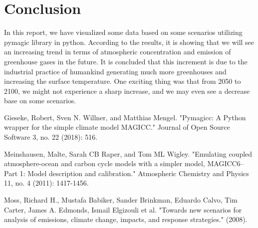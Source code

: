 \documentclass[12pt]{article}
\begin{document}
\section{Conclusion}
\label{lab:conclusion}
In this report, we have visualized some data based on some scenarios utilizing pymagic library in python. According to the results, it is showing that we will see an increasing trend in terms of atmospheric concentration and emission of greenhouse gases in the future. It is concluded that this increment is due to the industrial practice of humankind generating much more greenhouses and increasing the surface temperature. One exciting thing was that from 2050 to 2100, we might not experience a sharp increase, and we may even see a decrease base on some scenarios. 

\begin{thebibliography}{9}
Gieseke, Robert, Sven N. Willner, and Matthias Mengel. "Pymagicc: A Python wrapper for the simple climate model MAGICC." Journal of Open Source Software 3, no. 22 (2018): 516.

Meinshausen, Malte, Sarah CB Raper, and Tom ML Wigley. "Emulating coupled atmosphere-ocean and carbon cycle models with a simpler model, MAGICC6–Part 1: Model description and calibration." Atmospheric Chemistry and Physics 11, no. 4 (2011): 1417-1456.

Moss, Richard H., Mustafa Babiker, Sander Brinkman, Eduardo Calvo, Tim Carter, James A. Edmonds, Ismail Elgizouli et al. "Towards new scenarios for analysis of emissions, climate change, impacts, and response strategies." (2008).

\end{thebibliography}
\end{document}
